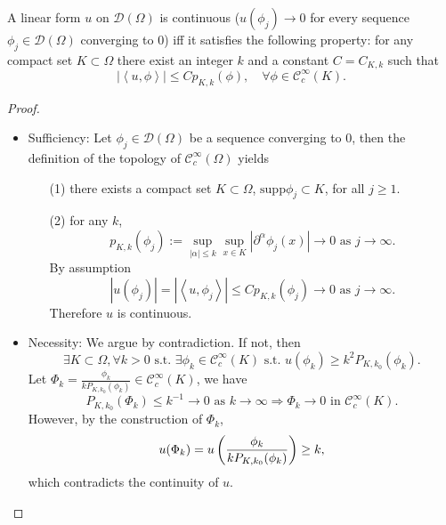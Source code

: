 \begin{pro}
  A linear form $u$ on $\mathcal{D}(\Omega)$ is continuous
  ($u(\phi_j)\to 0$ for every sequence $\phi_j\in\mathcal{D}(\Omega)$ converging to $0$)
  iff it satisfies the following property:
  for any compact set $K\subset \Omega$
  there exist an integer $k$ and a constant $C = C_{K, k}$ such that
  \begin{displaymath}
    |\left\langle u, \phi\right\rangle| \le Cp_{K, k}(\phi), \quad\forall\phi\in\mathcal{C}_c^{\infty}(K).
  \end{displaymath}
\end{pro}

\begin{proof}
  \begin{itemize}
  \item Sufficiency:
    Let $\phi_j\in\mathcal{D}(\Omega)$ be a sequence converging to $0$,
    then the definition of the topology of
    $\mathcal{C}_c^{\infty}(\Omega)$ yields
    \begin{itemize}
    \item[(1)]
      there exists a compact set $K\subset \Omega$,
      $\mathrm{supp}\phi_j\subset K$,
      for all $j\ge 1$.
    \item[(2)]
      for any $k$,
      \begin{displaymath}
        p_{K, k}(\phi_j) := \sup_{|\alpha|\le k}\sup_{x\in K}|\partial^{\alpha}\phi_j(x)|\to 0 \text{ as } j\to\infty.
      \end{displaymath}
      By assumption
      \begin{displaymath}
        |u(\phi_j)| = |\left\langle u, \phi_j\right\rangle| \le
        Cp_{K, k}(\phi_j) \to 0 \text{ as } j\to\infty.
      \end{displaymath}
      Therefore $u$ is continuous.
    \end{itemize}

  \item Necessity:
    We argue by contradiction.
    If not, then
    \begin{displaymath}
      \exists K\subset \Omega, \forall k>0 \text{ s.t. }
      \exists \phi_k\in\mathcal{C}_c^{\infty}(K) \text{ s.t. }
      u(\phi_k) \ge k^2P_{K, k_0}(\phi_k).
    \end{displaymath}
    Let $\Phi_k=\frac{\phi_k}{kP_{K,k_0}(\phi_k)}\in\mathcal{C}_c^{\infty}(K)$,
    we have
    \begin{displaymath}
      P_{K, k_0}(\Phi_k)\le k^{-1} \to 0 \text{ as } k\to\infty
      \Rightarrow
      \Phi_k\to 0 \text{ in } \mathcal{C}_c^{\infty}(K).
    \end{displaymath}
    However,
    by the construction of $\Phi_k$,
    \begin{displaymath}
      u(\Phi_k) = u\left( \frac{\phi_k}{kP_{K, k_0}(\phi_k)}\right) \ge k,
    \end{displaymath}
    which contradicts the continuity of $u$.
  \end{itemize}
\end{proof}
